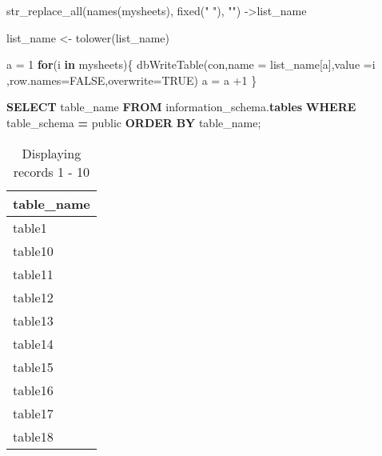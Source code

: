 \documentclass[
]{article}
\newenvironment{Shaded}{\begin{snugshade}}{\end{snugshade}}
\newcommand{\AttributeTok}[1]{\textcolor[rgb]{0.77,0.63,0.00}{#1}}
\newcommand{\ConstantTok}[1]{\textcolor[rgb]{0.00,0.00,0.00}{#1}}
\newcommand{\ControlFlowTok}[1]{\textcolor[rgb]{0.13,0.29,0.53}{\textbf{#1}}}
\newcommand{\DecValTok}[1]{\textcolor[rgb]{0.00,0.00,0.81}{#1}}
\newcommand{\FunctionTok}[1]{\textcolor[rgb]{0.00,0.00,0.00}{#1}}
\newcommand{\KeywordTok}[1]{\textcolor[rgb]{0.13,0.29,0.53}{\textbf{#1}}}
\newcommand{\NormalTok}[1]{#1}
\newcommand{\OperatorTok}[1]{\textcolor[rgb]{0.81,0.36,0.00}{\textbf{#1}}}
\newcommand{\OtherTok}[1]{\textcolor[rgb]{0.56,0.35,0.01}{#1}}
\newcommand{\SpecialCharTok}[1]{\textcolor[rgb]{0.00,0.00,0.00}{#1}}
\newcommand{\StringTok}[1]{\textcolor[rgb]{0.31,0.60,0.02}{#1}}
\begin{document}
\begin{Shaded}
\begin{Highlighting}[]
\FunctionTok{str\_replace\_all}\NormalTok{(}\FunctionTok{names}\NormalTok{(mysheets), }\FunctionTok{fixed}\NormalTok{(}\StringTok{" "}\NormalTok{), }\StringTok{""}\NormalTok{) }\OtherTok{{-}\textgreater{}}\NormalTok{list\_name}


\NormalTok{list\_name }\OtherTok{\textless{}{-}} \FunctionTok{tolower}\NormalTok{(list\_name)}

\NormalTok{a }\OtherTok{=} \DecValTok{1}
 \ControlFlowTok{for}\NormalTok{(i }\ControlFlowTok{in}\NormalTok{ mysheets)\{}
  \FunctionTok{dbWriteTable}\NormalTok{(con,}\AttributeTok{name =}\NormalTok{ list\_name[a],}\AttributeTok{value =}\NormalTok{i ,}\AttributeTok{row.names=}\ConstantTok{FALSE}\NormalTok{,}\AttributeTok{overwrite=}\ConstantTok{TRUE}\NormalTok{)}
\NormalTok{   a }\OtherTok{=}\NormalTok{ a }\SpecialCharTok{+}\DecValTok{1}
\NormalTok{   \}}
\end{Highlighting}
\end{Shaded}

\begin{Shaded}
\begin{Highlighting}[]

\KeywordTok{SELECT}\NormalTok{ table\_name}
\KeywordTok{FROM}\NormalTok{ information\_schema.}\KeywordTok{tables}
\KeywordTok{WHERE}\NormalTok{ table\_schema }\OperatorTok{=} \StringTok{\textquotesingle{}public\textquotesingle{}}
\KeywordTok{ORDER} \KeywordTok{BY}\NormalTok{ table\_name;}
\end{Highlighting}
\end{Shaded}

\begin{table}

\caption{\label{tab:unnamed-chunk-15}Displaying records 1 - 10}
\centering
\begin{tabular}[t]{l}
\hline
table\_name\\
\hline
table1\\
\hline
table10\\
\hline
table11\\
\hline
table12\\
\hline
table13\\
\hline
table14\\
\hline
table15\\
\hline
table16\\
\hline
table17\\
\hline
table18\\
\hline
\end{tabular}
\end{table}
\end{document}
